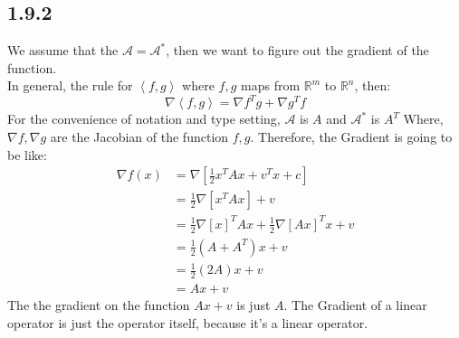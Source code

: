 \documentclass[]{article}
\begin{document}
    \subsection*{1.9.2}
        We assume that the $\mathcal{A} = \mathcal{A}^*$, then we want to figure out the gradient of the function. 
        \\[1.1em]
        In general, the rule for $\left\langle f, g \right\rangle$ where $f, g$ maps from $\mathbb{R}^m$ to $\mathbb{R}^n$, then: 
        $$
            \nabla \left\langle f, g \right\rangle = \nabla f^T g + \nabla g^T f
        $$
        For the convenience of notation and type setting, $\mathcal{A}$ is $A$ and $\mathcal{A}^*$ is $A^T$
        Where, $\nabla f, \nabla g$ are the Jacobian of the function $f, g$. Therefore, the Gradient is going to be like: 
        \begin{align*}\tag{1.9.2.1}\label{eqn:1.9.2.1}
            \nabla f(x) &= \nabla \left[
                \frac{1}{2}x^TAx + v^Tx + c
            \right]
            \\
            &= \frac{1}{2}\nabla \left[x^TAx\right] + v
            \\
            &= \frac{1}{2}\nabla[x]^TAx + \frac{1}{2}\nabla[Ax]^Tx + v
            \\
            &= 
            \frac{1}{2}(A + A^T)x + v
            \\
            &= 
            \frac{1}{2}(2A)x + v 
            \\
            &= 
            Ax + v
        \end{align*}
        The the gradient on the function $Ax + v$ is just $A$. The Gradient of a linear operator is just the operator itself, because it's a linear operator. 
\end{document}
